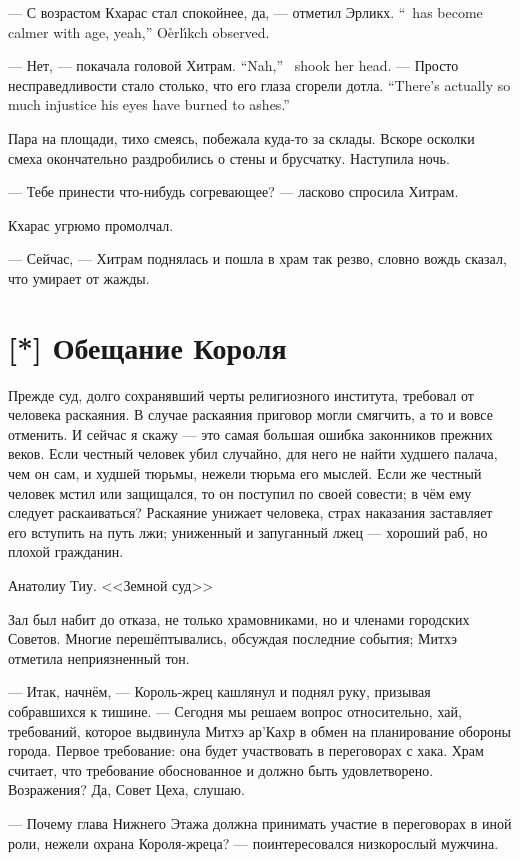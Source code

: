 {--- С возрастом Кхарас стал спокойнее, да, --- отметил Эрликх.}
{``\Kcharas\ has become calmer with age, yeah,'' O\r{e}rl\'{\i}kch observed.}

{--- Нет, --- покачала головой Хитрам.}
{``Nah,'' \Chitram\ shook her head.}
{--- Просто несправедливости стало столько, что его глаза сгорели дотла.}
{``There's actually so much injustice his eyes have burned to ashes.''}

Пара на площади, тихо смеясь, побежала куда-то за склады.
Вскоре осколки смеха окончательно раздробились о стены и брусчатку.
Наступила ночь.

--- Тебе принести что-нибудь согревающее? --- ласково спросила Хитрам.

Кхарас угрюмо промолчал.

--- Сейчас, --- Хитрам поднялась и пошла в храм так резво, словно вождь сказал, что умирает от жажды.

\section{[*] Обещание Короля}

\epigraph
{Прежде суд, долго сохранявший черты религиозного института, требовал от человека раскаяния.
В случае раскаяния приговор могли смягчить, а то и вовсе отменить.
И сейчас я скажу --- это самая большая ошибка законников прежних веков.
Если честный человек убил случайно, для него не найти худшего палача, чем он сам, и худшей тюрьмы, нежели тюрьма его мыслей.
Если же честный человек мстил или защищался, то он поступил по своей совести;
в чём ему следует раскаиваться?
Раскаяние унижает человека, страх наказания заставляет его вступить на путь лжи;
униженный и запуганный лжец --- хороший раб, но плохой гражданин.}
{Анатолиу Тиу.
<<Земной суд>>}

\textspace

Зал был набит до отказа, не только храмовниками, но и членами городских Советов.
Многие перешёптывались, обсуждая последние события;
Митхэ отметила неприязненный тон.

--- Итак, начнём, --- Король-жрец кашлянул и поднял руку, призывая собравшихся к тишине.
--- Сегодня мы решаем вопрос относительно, хай, требований, которое выдвинула Митхэ ар'Кахр в обмен на планирование обороны города.
Первое требование: она будет участвовать в переговорах с хака.
Храм считает, что требование обоснованное и должно быть удовлетворено.
Возражения?
Да, Совет Цеха, слушаю.

--- Почему глава Нижнего Этажа должна принимать участие в переговорах в иной роли, нежели охрана Короля-жреца? --- поинтересовался низкорослый мужчина.

